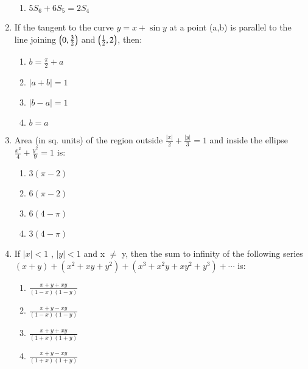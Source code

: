 \documentclass[journal]{IEEEtran}
\numberwithin{equation}{enumi}
\numberwithin{figure}{enumi}
\begin{document}
\begin{enumerate}
\begin{multicols}{2}
\begin{enumerate}
        \item $5S_6+6S_5=2S_4$
    \end{enumerate} 
    \end{multicols}
    \item If the tangent to the curve $y=x+\sin{y}$ at a point (a,b) is parallel to the line joining $\left(0,\frac{3}{2}\right)$ and $\left(\frac{1}{2},{2}\right)$, then: \\
    \begin{multicols}{4}
    \begin{enumerate}
        \item $b = \frac{\pi}{2} + a$
        \item $|a + b| = 1$
        \item $|b - a| = 1$
        \item $b = a$
    \end{enumerate} 
    \end{multicols}
    \item Area (in sq. units) of the region outside $\frac{|x|}{2} + \frac{|y|}{3} = 1$ and inside the ellipse $\frac{x^2}{4} + \frac{y^2}{9} = 1$ is: \\
    \begin{multicols}{4}
    \begin{enumerate}
        \item $3(\pi - 2)$
        \item $6(\pi - 2)$
        \item $6(4 - \pi)$
        \item $3(4 - \pi)$
    \end{enumerate} 
    \end{multicols}
    \item If $|x|<1$ , $|y|<1$ and x $\neq$ y, then the sum to infinity of the following series $(x+y)+(x^2+xy+y^2)+(x^3+x^2y+xy^2+y^3)+\cdots$ is: \\
    \begin{multicols}{4}
    \begin{enumerate}
        \item $\frac{x + y + xy}{(1 - x)(1 - y)}$
        \item $\frac{x + y - xy}{(1 - x)(1 - y)}$
        \item $\frac{x + y + xy}{(1 + x)(1 + y)}$
        \item $\frac{x + y - xy}{(1 + x)(1 + y)}$
    \end{enumerate} 
    \end{multicols}

\end{enumerate}
\end{document}
